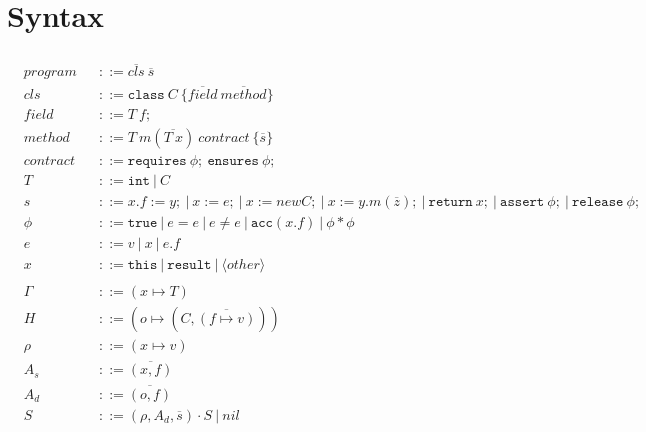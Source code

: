 \documentclass[11pt,a4paper]{article}
\begin{document}

\newcommand{\sfrme}{\ensuremath{\vdash_\texttt{sfrm}}}
\newcommand{\sfrmphi}{\ensuremath{\vdash_\texttt{sfrm}}}
\newcommand{\true}{\ensuremath{\texttt{true}}}
\newcommand{\vnull}{\ensuremath{\texttt{null}}}
\newcommand{\Tint}{\ensuremath{\texttt{int}}}
\newcommand{\xresult}{\ensuremath{\texttt{result}}}
\newcommand{\xthis}{\ensuremath{\texttt{this}}}
\newcommand{\new}{\ensuremath{\texttt{new}~}}
\newcommand{\assert}{\ensuremath{\texttt{assert}~}}
\newcommand{\release}{\ensuremath{\texttt{release}~}}
\newcommand{\return}{\ensuremath{\texttt{return}~}}
\newcommand{\acc}{\ensuremath{\texttt{acc}}}
\newcommand{\fields}{\ensuremath{\texttt{fields}}}
\newcommand{\mpre}{\ensuremath{\texttt{mpre}}}
\newcommand{\mpost}{\ensuremath{\texttt{mpost}}}
\newcommand{\mbody}{\ensuremath{\texttt{mbody}}}
\newcommand{\mparam}{\ensuremath{\texttt{mparam}}}
\newcommand{\staticFP}{\ensuremath{\texttt{static-footprint}}}
\newcommand{\dynamicFP}{\ensuremath{\texttt{footprint}_{H, \rho}}}
\newcommand{\rlabel}[1]{\RightLabel{\quad #1}}

\newcommand{\class}{\ensuremath{\texttt{class}~}}
\newcommand{\requires}{\ensuremath{\texttt{requires}~}}
\newcommand{\ensures}{\ensuremath{\texttt{ensures}~}}

\section{Syntax}

\begin{align*}
\\ &program    	&&::= \overline{cls}~\overline{s}
\\ &cls    		&&::= \class C~\{\overline{field}~\overline{method}\}
\\ &field    	&&::= T~f;
\\ &method		&&::= T~m(\overline{T~x})~contract~\{\overline{s}\}
\\ &contract	&&::= \requires \phi;~\ensures \phi;
\\ &T			&&::= \Tint ~|~ C
\\ &s			&&::= x.f := y;
				  ~|~ x := e; 
				  ~|~ x := new C; 
				  ~|~ x := y.m(\overline{z});
				  ~|~ \return x; 
				  ~|~ \assert \phi; 
				  ~|~ \release \phi;
\\ &\phi		&&::= \true
				  ~|~ e = e
				  ~|~ e \neq e
				  ~|~ \acc(x.f)
				  ~|~ \phi * \phi
\\ &e			&&::= v
				  ~|~ x
				  ~|~ e.f
\\ &x			&&::= \xthis ~|~ \xresult ~|~ \langle other \rangle
\\				  
\\ &\Gamma		&&::= (x \mapsto T)
\\ &H			&&::= (o \mapsto (C,\overline{(f \mapsto v)}))
\\ &\rho		&&::= (x \mapsto v)
\\ &A_s			&&::= \overline{(x, f)}
\\ &A_d			&&::= \overline{(o, f)}
\\ &S			&&::= (\rho, A_d, \overline{s}) \cdot S ~|~ nil
\end{align*}
\end{document}
